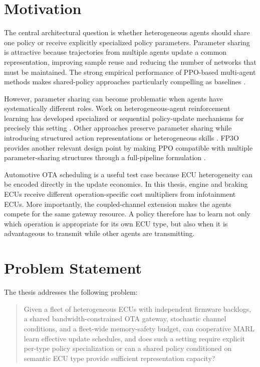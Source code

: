 \documentclass{iutbscthesis}
\begin{document}
\section{Motivation}
The central architectural question is whether heterogeneous agents should share one policy or receive explicitly specialized policy parameters. Parameter sharing is attractive because trajectories from multiple agents update a common representation, improving sample reuse and reducing the number of networks that must be maintained. The strong empirical performance of PPO-based multi-agent methods makes shared-policy approaches particularly compelling as baselines \parencite{yu2022surprising}.

However, parameter sharing can become problematic when agents have systematically different roles. Work on heterogeneous-agent reinforcement learning has developed specialized or sequential policy-update mechanisms for precisely this setting \parencite{zhong2023harl}. Other approaches preserve parameter sharing while introducing structured action representations or heterogeneous skills \parencite{yu2024uas,liu2022hskill}. FP3O provides another relevant design point by making PPO compatible with multiple parameter-sharing structures through a full-pipeline formulation \parencite{feng2023fp3o}.

Automotive OTA scheduling is a useful test case because ECU heterogeneity can be encoded directly in the update economics. In this thesis, engine and braking ECUs receive different operation-specific cost multipliers from infotainment ECUs. More importantly, the coupled-channel extension makes the agents compete for the same gateway resource. A policy therefore has to learn not only which operation is appropriate for its own ECU type, but also when it is advantageous to transmit while other agents are transmitting.

\section{Problem Statement}
The thesis addresses the following problem:

\begin{quote}
Given a fleet of heterogeneous ECUs with independent firmware backlogs, a shared bandwidth-constrained OTA gateway, stochastic channel conditions, and a fleet-wide memory-safety budget, can cooperative MARL learn effective update schedules, and does such a setting require explicit per-type policy specialization or can a shared policy conditioned on semantic ECU type provide sufficient representation capacity?
\end{quote}
\end{document}

